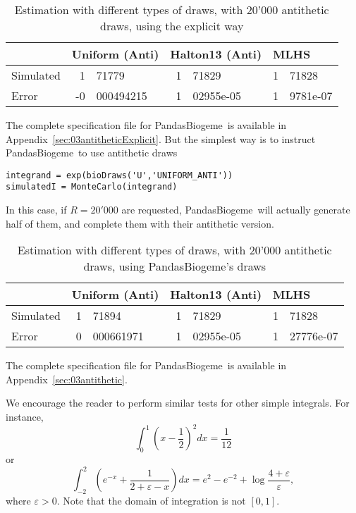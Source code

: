 \documentclass[12pt,a4paper]{article}
\newcommand{\PBIOGEME}{PandasBiogeme}
\begin{document}
\begin{table}[htb]
  \begin{center}
    \begin{tabular}{lr@{.}lr@{.}lr@{.}l}
		& \multicolumn{2}{l}{Uniform (Anti)} &
      \multicolumn{2}{l}{Halton13 (Anti)} &
      \multicolumn{2}{l}{MLHS} 
      (Anti) \\
      \hline
Simulated	&1&71779 &	1&71829 &	1&71828 \\
Error	&	-0&000494215 &	1&02955e-05 &	1&9781e-07
    \end{tabular}
  \caption{Estimation with different types of draws,
  with 20'000 antithetic draws, using the explicit way}
  \end{center}
\end{table}

The complete specification file for \PBIOGEME\ is available in Appendix~\ref{sec:03antitheticExplicit}.
But the simplest way is to instruct \PBIOGEME\ to use antithetic draws

\begin{lstlisting}
integrand = exp(bioDraws('U','UNIFORM_ANTI'))
simulatedI = MonteCarlo(integrand)
\end{lstlisting}
In this case, if $R=20'000$ are requested, \PBIOGEME\ will actually
generate half of them, and complete them with their antithetic version.

\begin{table}[htb]
  \begin{center}
    \begin{tabular}{lr@{.}lr@{.}lr@{.}l}
		& \multicolumn{2}{l}{Uniform (Anti)} &
      \multicolumn{2}{l}{Halton13 (Anti)} &
      \multicolumn{2}{l}{MLHS} 
      (Anti) \\
      \hline
Simulated &	1&71894 &	1&71829 &	1&71828 \\
Error	&	0&000661971 &	1&02955e-05 &	1&27776e-07
    \end{tabular}
  \caption{Estimation with different types of draws,
  with 20'000 antithetic draws, using \PBIOGEME's draws}
  \end{center}
\end{table}

The complete specification file for \PBIOGEME\ is available in Appendix~\ref{sec:03antithetic}.


We encourage the reader to perform similar  tests for other simple
integrals. For instance,
\begin{equation}
\int_0^1 \left(x-\frac{1}{2} \right)^2 dx = \frac{1}{12}
\end{equation}
or
\begin{equation}
\int_{-2}^2 \left( e^{-x} + \frac{1}{2+\varepsilon-x}\right)dx= e^2 -
e^{-2} + \log \frac{4+\varepsilon}{\varepsilon},
\end{equation}
where $\varepsilon > 0$. Note that the domain of integration is not $[0,1]$.
\end{document}
